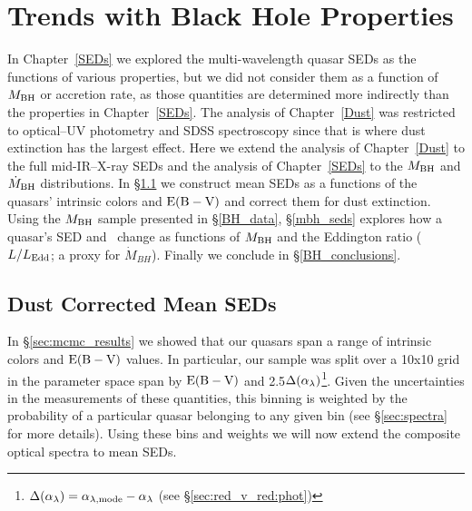 \chapter{Trends with Black Hole Properties} \label{BH}
 
In Chapter~\ref{SEDs} we explored the multi-wavelength quasar SEDs as the functions of various properties, but we did not consider them as a function of $M_{\rm BH}$ or accretion rate, as those quantities are determined more indirectly than the properties in Chapter~\ref{SEDs}.  The analysis of Chapter~\ref{Dust} was restricted to optical--UV photometry and SDSS spectroscopy since that is where dust extinction has the largest effect.  Here we extend the analysis of Chapter~\ref{Dust} to the full mid-IR--X-ray SEDs and the analysis of Chapter~\ref{SEDs} to the $M_{\rm BH}$ and $\dot{M}_{\rm BH}$ distributions.
In \S\ref{dust_seds} we construct mean SEDs as a functions of the quasars' intrinsic colors and ${\rm E(B-V)}$ and correct them for dust extinction.
Using the $M_{\rm BH}$ sample presented in \S\ref{BH_data}, \S\ref{mbh_seds} explores how a quasar's SED and \bctwofive\ change as functions of $M_{\rm BH}$ and the Eddington ratio ($L/L_{\rm Edd}$; a proxy for $\dot{M}_{BH}$).   Finally we conclude in \S\ref{BH_conclusions}.

\section{Dust Corrected Mean SEDs} \label{dust_seds}

In \S\ref{sec:mcmc_results} we showed that our quasars span a range of intrinsic colors and ${\rm E(B-V)}$ values.  
In particular, our sample was split over a 10x10 grid in the parameter space span by ${\rm E(B-V)}$ and 2.5$\Delta(\alpha_{\lambda})$\footnote{$\Delta(\alpha_{\lambda}) = \alpha_{\lambda, {\rm  mode}} - \alpha_\lambda$ (see \S\ref{sec:red_v_red:phot})}.
Given the uncertainties in the measurements of these quantities, this binning is weighted by the probability of a particular quasar belonging to any given bin (see \S\ref{sec:spectra} for more details).  Using these bins and weights we will now extend the composite optical spectra to mean SEDs.

